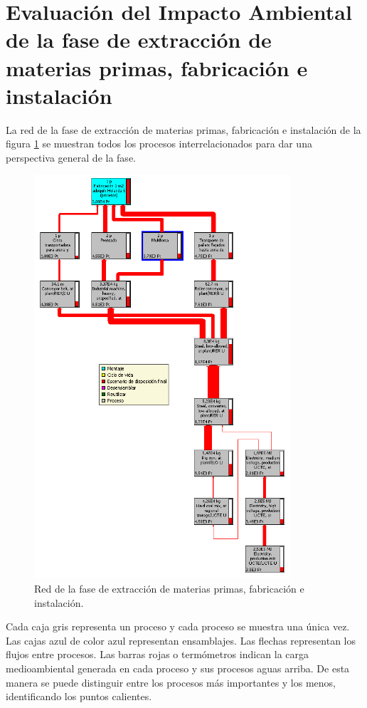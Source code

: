 \section{Evaluación del Impacto Ambiental de la fase de extracción de materias primas, fabricación e instalación}

La red de la fase de extracción de materias primas, fabricación e instalación de la figura \ref{fig:fabric_red} se muestran todos los procesos interrelacionados para dar una perspectiva general de la fase.

\begin{figure}[!htb]
\centering
\includegraphics[height=15cm]{img/fabric_red.png}
\caption{Red de la fase de extracción de materias primas, fabricación e instalación.}
\label{fig:fabric_red}
\end{figure}

Cada caja gris representa un proceso y cada proceso se muestra una única vez. Las cajas azul de color azul representan ensamblajes. Las flechas representan los flujos entre procesos. Las barras rojas o termómetros indican la carga medioambiental generada en cada proceso y sus procesos aguas arriba. De esta manera se puede distinguir entre los procesos más importantes y los menos, identificando los puntos calientes.

